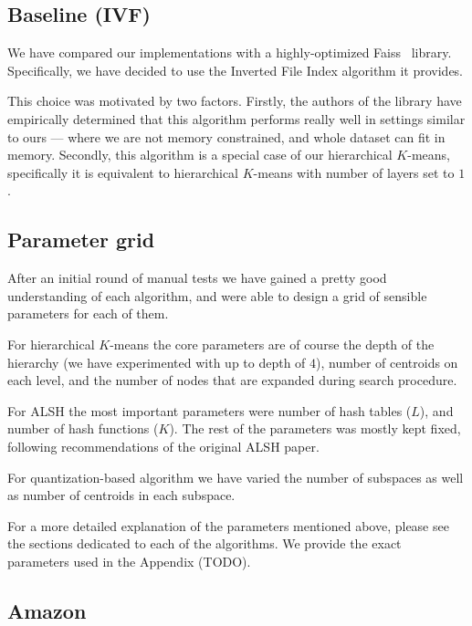     \subsection{Baseline (IVF)}\label{subsec:baselineivf}

        We have compared our implementations with a highly-optimized Faiss~\cite{faiss} library.
        Specifically, we have decided to use the Inverted File Index algorithm it provides.

        This choice was motivated by two factors.
        Firstly, the authors of the library have empirically determined that this algorithm performs
        really well in settings similar to ours --- where we are not memory constrained, and whole dataset
        can fit in memory.
        Secondly, this algorithm is a special case of our hierarchical $K$-means, specifically
        it is equivalent to hierarchical $K$-means with number of layers set to $1$.

    \subsection{Parameter grid}\label{subsec:parameterGrid}

        After an initial round of manual tests we have gained a pretty good understanding of
        each algorithm, and were able to design a grid of sensible parameters for each of them.

        For hierarchical $K$-means the core parameters are of course the depth of the hierarchy
        (we have experimented with up to depth of $4$), number of centroids on each level,
        and the number of nodes that are expanded during search procedure.

        For ALSH the most important parameters were number of hash tables ($L$),
        and number of hash functions ($K$). The rest of the parameters was mostly kept fixed, following
        recommendations of the original ALSH paper.

        For quantization-based algorithm we have varied the number of subspaces as well as number of centroids
        in each subspace.

        For a more detailed explanation of the parameters mentioned above, please see the sections
        dedicated to each of the algorithms.
        We provide the exact parameters used in the Appendix (TODO).

    \subsection{Amazon}

